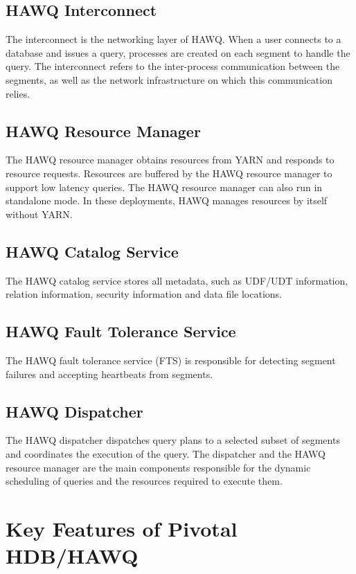 \documentclass[9pt,twocolumn,twoside]{../../styles/osajnl}
\begin{document}
\subsection{HAWQ Interconnect}

The interconnect is the networking layer of HAWQ. When a user
connects to a database and issues a query, processes are created on
each segment to handle the query. The interconnect refers to the
inter-process communication between the segments, as well as the
network infrastructure on which this communication relies.

\subsection{HAWQ Resource Manager}

The HAWQ resource manager obtains resources from YARN and responds to
resource requests. Resources are buffered by the HAWQ resource
manager to support low latency queries. The HAWQ resource manager can
also run in standalone mode. In these deployments, HAWQ manages
resources by itself without YARN.

\subsection{HAWQ Catalog Service}

The HAWQ catalog service stores all metadata, such as
{UDF/UDT}\cite{www-udt}
information, relation information, security information and data file
locations.

\subsection{HAWQ Fault Tolerance Service}

The HAWQ fault tolerance service (FTS) is responsible for detecting
segment failures and accepting heartbeats from segments.

\subsection{HAWQ Dispatcher}

The HAWQ dispatcher dispatches query plans to a selected subset of
segments and coordinates the execution of the query. The dispatcher
and the HAWQ resource manager are the main components responsible for
the dynamic scheduling of queries and the resources required to
execute them.

\section{Key Features of Pivotal HDB/HAWQ}
\end{document}
